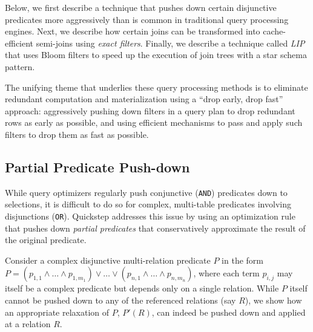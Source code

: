 Below, we first describe a technique that pushes down certain disjunctive predicates more aggressively than is common in traditional query processing engines. Next, we describe how certain joins can be transformed into cache-efficient semi-joins using \textit{exact filters}. Finally, we describe a technique called \textit{LIP} that uses Bloom filters to speed up the execution of join trees with a star schema pattern.

The unifying theme that underlies these query processing methods is to eliminate redundant computation and materialization using a ``drop early, drop fast'' approach: aggressively pushing down filters in a query plan to drop redundant rows as early as possible, and using efficient mechanisms to pass and apply such filters to drop them as fast as possible.


\subsection{Partial Predicate Push-down}
\label{sec-pushdown-disj-preds}
While query optimizers regularly push conjunctive (\texttt{AND}) predicates down to selections, it is difficult to do so for complex, multi-table predicates involving disjunctions (\texttt{OR}). Quickstep addresses this issue by using an optimization rule that pushes down \textit{partial predicates} that conservatively approximate the result of the original predicate.

Consider a complex disjunctive multi-relation predicate $P$ in the form $P = (p_{1,1} \wedge \dots \wedge p_{1, m_1}) \vee \dots \vee (p_{n,1} \wedge \dots \wedge p_{n, m_n})$, where each term $p_{i,j}$ may itself be a complex predicate but depends only on a single relation. While $P$ itself cannot be pushed down to any of the referenced relations (say $R$), we show how an appropriate relaxation of $P$, $P'(R)$, can indeed be pushed down and applied at a relation $R$.

